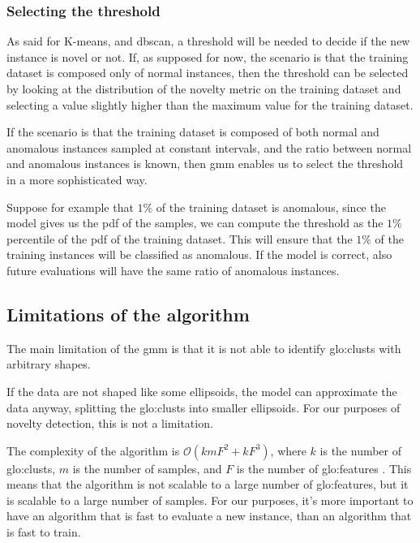 \subsubsection{Selecting the threshold}
As said for K-means, and \gls{dbscan}, a threshold will be needed to decide if the new instance is novel or not. If, as supposed for now, the scenario is that the training dataset is composed only of normal instances, then the threshold can be selected by looking at the distribution of the novelty metric on the training dataset and selecting a value slightly higher than the maximum value for the training dataset.

If the scenario is that the training dataset is composed of both normal and anomalous instances sampled at constant intervals, and the ratio between normal and anomalous instances is known, then \gls{gmm} enables us to select the threshold in a more sophisticated way.

Suppose for example that $1\%$ of the training dataset is anomalous, since the model gives us the \gls{pdf} of the samples, we can compute the threshold as the $1\%$ percentile of the \gls{pdf} of the training dataset. This will ensure that the $1\%$ of the training instances will be classified as anomalous. If the model is correct, also future evaluations will have the same ratio of anomalous instances.

\subsection{Limitations of the algorithm}
The main limitation of the \gls{gmm} is that it is not able to identify \gls{glo:clust}s with arbitrary shapes.

If the data are not shaped like some ellipsoids, the model can approximate the data anyway, splitting the \gls{glo:clust}s into smaller ellipsoids. For our purposes of novelty detection, this is not a limitation.

The complexity of the algorithm is $\mathcal{O}(kmF^2+kF^3)$, where $k$ is the number of \gls{glo:clust}s, $m$ is the number of samples, and $F$ is the number of \gls{glo:feature}s . This means that the algorithm is not scalable to a large number of \gls{glo:feature}s, but it is scalable to a large number of samples.
For our purposes, it's more important to have an algorithm that is fast to evaluate a new instance, than an algorithm that is fast to train.